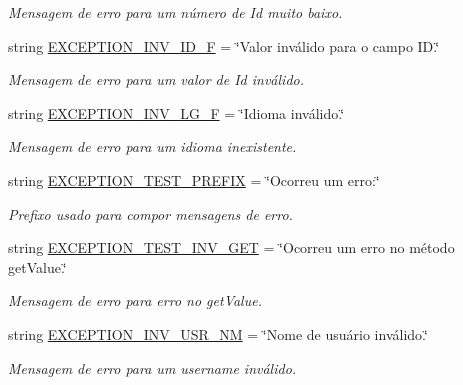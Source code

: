 \begin{DoxyCompactItemize}
\begin{DoxyCompactList}\small\item\em Mensagem de erro para um número de Id muito baixo. \end{DoxyCompactList}\item 
string \hyperlink{namespaceELO_1_1lang_1_1pt__br_af03bc5adf0c3f43ec2a53fedb3a4f6dd}{E\-X\-C\-E\-P\-T\-I\-O\-N\-\_\-\-I\-N\-V\-\_\-\-I\-D\-\_\-\-F} = \char`\"{}Valor inválido para o campo I\-D.\char`\"{}
\begin{DoxyCompactList}\small\item\em Mensagem de erro para um valor de Id inválido. \end{DoxyCompactList}\item 
string \hyperlink{namespaceELO_1_1lang_1_1pt__br_a6c600c16de98b175e02239d96ba494c6}{E\-X\-C\-E\-P\-T\-I\-O\-N\-\_\-\-I\-N\-V\-\_\-\-L\-G\-\_\-\-F} = \char`\"{}Idioma inválido.\char`\"{}
\begin{DoxyCompactList}\small\item\em Mensagem de erro para um idioma inexistente. \end{DoxyCompactList}\item 
string \hyperlink{namespaceELO_1_1lang_1_1pt__br_a463c20b7bffd2f786b0681ab4290257b}{E\-X\-C\-E\-P\-T\-I\-O\-N\-\_\-\-T\-E\-S\-T\-\_\-\-P\-R\-E\-F\-I\-X} = \char`\"{}Ocorreu um erro\-:\char`\"{}
\begin{DoxyCompactList}\small\item\em Prefixo usado para compor mensagens de erro. \end{DoxyCompactList}\item 
string \hyperlink{namespaceELO_1_1lang_1_1pt__br_a3bb3602f4ced69134607abfe16e93d5d}{E\-X\-C\-E\-P\-T\-I\-O\-N\-\_\-\-T\-E\-S\-T\-\_\-\-I\-N\-V\-\_\-\-G\-E\-T} = \char`\"{}Ocorreu um erro no método get\-Value.\char`\"{}
\begin{DoxyCompactList}\small\item\em Mensagem de erro para erro no get\-Value. \end{DoxyCompactList}\item 
string \hyperlink{namespaceELO_1_1lang_1_1pt__br_a7c76b59cd9101852b40dccfac9cd8a1e}{E\-X\-C\-E\-P\-T\-I\-O\-N\-\_\-\-I\-N\-V\-\_\-\-U\-S\-R\-\_\-\-N\-M} = \char`\"{}Nome de usuário inválido.\char`\"{}
\begin{DoxyCompactList}\small\item\em Mensagem de erro para um username inválido. \end{DoxyCompactList}\item 

\end{DoxyCompactItemize}
